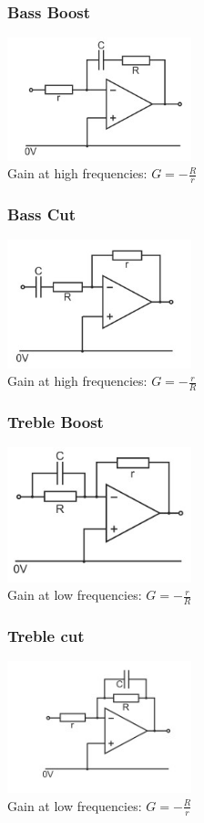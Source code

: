 \documentclass[a4paper, 11pt, twocolumn]{article}
\begin{document}
    \subsubsection{Bass Boost}
    \includegraphics[width=0.4\textwidth]{bassBoost.jpg} \\
    Gain at high frequencies: $\displaystyle G = -\frac{R}{r}$
    \subsubsection{Bass Cut}
    \includegraphics[width=0.4\textwidth]{bassCut.jpg} \\
    Gain at high frequencies: $\displaystyle G = -\frac{r}{R}$
    \subsubsection{Treble Boost}
    \includegraphics[width=0.4\textwidth]{trebleBoost.jpg} \\
    Gain at low frequencies: $\displaystyle G = -\frac{r}{R}$
    \subsubsection{Treble cut}
    \includegraphics[width=0.4\textwidth]{trebleCut.jpg} \\
    Gain at low frequencies: $\displaystyle G = -\frac{R}{r}$
\end{document}
